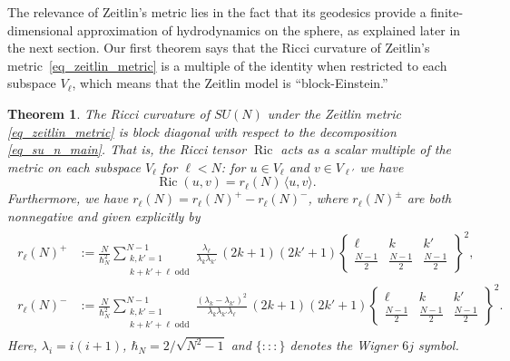 \documentclass[11pt]{amsart}
\numberwithin{equation}{section}
\newtheorem{theorem}{Theorem}
\theoremstyle{definition}
\DeclareMathOperator{\Ric}{Ric}
\begin{document}
The relevance of Zeitlin's metric lies in the fact that its geodesics provide a finite-dimensional approximation of hydrodynamics on the sphere, as explained later in the next section.
Our first theorem says that the Ricci curvature of Zeitlin's metric~\eqref{eq_zeitlin_metric} is a multiple of the identity when restricted to each subspace $V_{\ell}$, which means that the Zeitlin model is ``block-Einstein.''





\begin{theorem}\label{main_thm}
The Ricci curvature of $SU(N)$ under the Zeitlin metric \eqref{eq_zeitlin_metric} is block diagonal with respect to the decomposition \eqref{eq_su_n_main}. 
That is, the Ricci tensor $\Ric$ acts as a scalar multiple of the metric on each subspace $V_{\ell}$ for $\ell<N$:
for $u\in V_{\ell}$ and $v\in V_{\ell'}$ we have 
\begin{equation*}
    \Ric(u,v) =  
    r_{\ell}(N) \, \langle u,v\rangle. 
\end{equation*}
Furthermore, we have $r_{\ell}(N) = r_{\ell}(N)^+ - r_{\ell}(N)^-$, where $r_{\ell}(N)^{\pm}$ are both nonnegative and given explicitly by 
\begin{gather}\label{eq_ricci_intro}
\begin{split}
r_{\ell}(N)^+ &:= \frac{N}{\hbar_N^2} \sum\limits_{\substack{k, k' = 1 \\ k+k'+\ell\;\mathrm{odd}}}^{N-1} \frac{\lambda_{\ell}}{\lambda_{k}\lambda_{k'} } 
\, (2k+1)(2k'+1)  \left\{\begin{matrix}
\ell & k & k' \\
\frac{N-1}{2} & \frac{N-1}{2} & \frac{N-1}{2}
\end{matrix}
\right\}^2,
\\ 
r_{\ell}(N)^- &:= \frac{N}{\hbar_N^2} \sum\limits_{\substack{k, k' = 1 \\ k+k'+\ell \;\mathrm{odd}}}^{N-1} \frac{  (\lambda_{k}-\lambda_{k'})^2}{\lambda_{k}\lambda_{k'}\lambda_{\ell}} 
\, (2k+1)(2k'+1)  \left\{\begin{matrix}
\ell & k & k' \\
\frac{N-1}{2} & \frac{N-1}{2} & \frac{N-1}{2}
\end{matrix}
\right\}^2.
\end{split}
\end{gather}
Here, $\lambda_i = i(i+1)$, $\hbar_N = 2/\sqrt{N^2-1}$ and $\{:::\}$ denotes the Wigner $6j$ symbol. 
\end{theorem}
\end{document}
